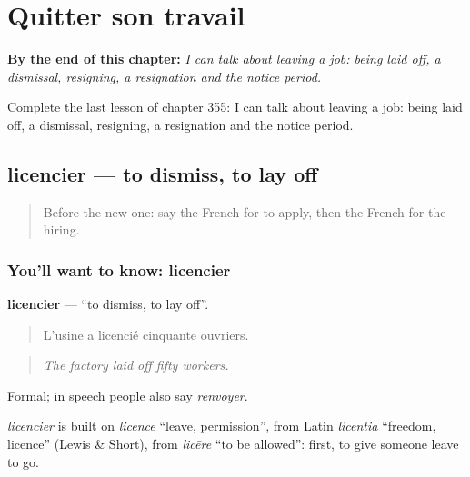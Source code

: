 
\chapter{Quitter son travail}
\label{ch:fr-quitter-son-travail}

\begin{chapteropening}
\textbf{By the end of this chapter:} \emph{I can talk about leaving a job: being laid off, a dismissal, resigning, a resignation and the notice period.}

Complete the last lesson of chapter 355: I can talk about leaving a job: being laid off, a dismissal, resigning, a resignation and the notice period.
\end{chapteropening}

\section[licencier]{licencier — to dismiss, to lay off}

\label{lesson:FR-C355-licencier}



\begin{quote}
Before the new one: say the French for to apply, then the French for the hiring.
\end{quote}

\subsection*{You'll want to know: licencier}
\textbf{licencier} — \textquotedblleft{}to dismiss, to lay off\textquotedblright{}.

\begin{quote}
L'usine a licencié cinquante ouvriers.
\end{quote}

\begin{quote}
\emph{The factory laid off fifty workers.}
\end{quote}

Formal; in speech people also say \emph{renvoyer}.

\begin{cousinweb}
\emph{licencier} is built on \emph{licence} \textquotedblleft{}leave, permission\textquotedblright{}, from Latin \emph{licentia} \textquotedblleft{}freedom, licence\textquotedblright{} (Lewis \& Short), from \emph{licēre} \textquotedblleft{}to be allowed\textquotedblright{}: first, to give someone leave to go.
\end{cousinweb}

